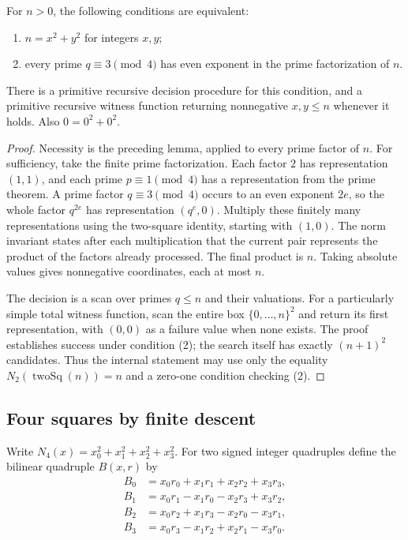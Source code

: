 \begin{theorem}\label{qr:two-classification}
For $n>0$, the following conditions are equivalent:
\begin{enumerate}
\item $n=x^2+y^2$ for integers $x,y$;
\item every prime $q\equiv3\pmod4$ has even exponent in the
prime factorization of $n$.
\end{enumerate}
There is a primitive recursive decision procedure for this condition,
and a primitive recursive witness function returning nonnegative
$x,y\le n$ whenever it holds. Also $0=0^2+0^2$.
\end{theorem}
\begin{proof}
Necessity is the preceding lemma, applied to every prime factor of $n$.
For sufficiency, take the finite prime factorization. Each factor $2$
has representation $(1,1)$, and each prime $p\equiv1\pmod4$ has
a representation from the prime theorem. A prime factor
$q\equiv3\pmod4$ occurs to an even exponent $2e$, so the whole
factor $q^{2e}$ has representation $(q^e,0)$. Multiply these finitely
many representations using the two-square identity, starting with
$(1,0)$. The norm invariant states after each multiplication that the
current pair represents the product of the factors already processed.
The final product is $n$. Taking absolute values gives nonnegative
coordinates, each at most $n$.

The decision is a scan over primes $q\le n$ and their valuations.
For a particularly simple total witness function, scan the entire box
$\{0,\ldots,n\}^2$ and return its first representation, with $(0,0)$
as a failure value when none exists. The proof establishes success
under condition (2); the search itself has exactly $(n+1)^2$ candidates.
Thus the internal statement may use only the equality
$N_2(\operatorname{twoSq}(n))=n$ and a zero-one condition checking (2).
\end{proof}

\subsection{Four squares by finite descent}

Write $N_4(x)=x_0^2+x_1^2+x_2^2+x_3^2$. For two signed integer
quadruples define the bilinear quadruple $B(x,r)$ by
\begin{align*}
 B_0&=x_0r_0+x_1r_1+x_2r_2+x_3r_3,\\
 B_1&=x_0r_1-x_1r_0-x_2r_3+x_3r_2,\\
 B_2&=x_0r_2+x_1r_3-x_2r_0-x_3r_1,\\
 B_3&=x_0r_3-x_1r_2+x_2r_1-x_3r_0.
\end{align*}

